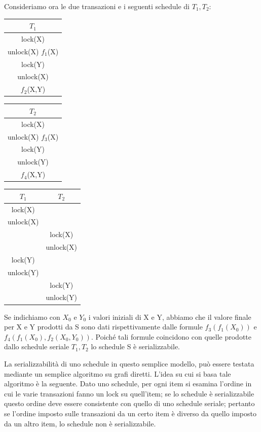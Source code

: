 Consideriamo ora le due transazioni e i seguenti schedule di $T_1 ,T_2$:
\begin{center}
    \begin{tabular}{|c|}
        \hline $T_1$\\\hline
        lock(X)\\
        unlock(X) $f_1$(X)\\
        lock(Y)\\
        unlock(X)\\
        $f_2$(X,Y)\\\hline
    \end{tabular}
    \begin{tabular}{|c|}
        \hline $T_2$\\\hline
        lock(X)\\
        unlock(X) $f_3$(X)\\
        lock(Y)\\
        unlock(Y)\\
        $f_4$(X,Y)\\\hline
    \end{tabular}\hspace{1cm}
    \begin{tabular}{|c|c|}
        \hline $T_1$&$T_2$ \\\hline
        lock(X) & \\
        unlock(X) & \\
        & lock(X)\\
        & unlock(X)\\
        lock(Y) & \\
        unlock(Y) & \\
        & lock(Y)\\
        & unlock(Y)\\\hline
    \end{tabular}
\end{center}
Se indichiamo con $X_0$ e $Y_0$ i valori iniziali di X e Y, abbiamo che il valore finale per X e Y prodotti da S sono dati rispettivamente dalle formule $f_3 (f_1 (X_0 ))$ e $f_4 (f_1 (X_0 ), f_2 (X_0,Y_0))$. Poiché tali formule coincidono con quelle prodotte dallo schedule seriale $T_1 ,T_2$ lo schedule S è serializzabile.

La serializzabilità di uno schedule in questo semplice modello, può essere testata mediante un semplice algoritmo su grafi diretti. L'idea su cui si basa tale algoritmo è la seguente. Dato uno schedule, per ogni item si esamina l'ordine in cui le varie transazioni fanno un lock su quell'item; se lo schedule è serializzabile questo ordine deve essere consistente con quello di uno schedule seriale; pertanto se l'ordine imposto sulle transazioni da un certo item è diverso da quello imposto da un altro item, lo schedule non è serializzabile.

